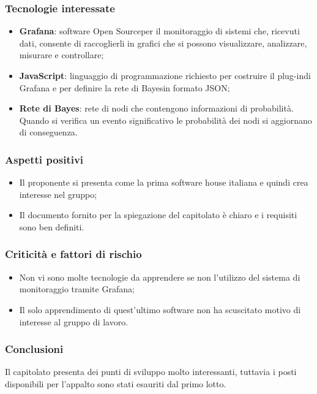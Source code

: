 \subsubsection{Tecnologie interessate}
\begin{itemize}
	\item \textbf{Grafana}: software Open Source\glo per il monitoraggio di sistemi che, ricevuti dati, consente di raccoglierli in grafici che si possono visualizzare, analizzare, misurare e controllare; 
	\item \textbf{JavaScript}: linguaggio di programmazione richiesto per costruire il plug-in\glo di Grafana e per definire la rete di Bayes\glo in formato JSON\glo;
	\item \textbf{Rete di Bayes}: rete di nodi che contengono informazioni di probabilità. Quando si verifica un evento significativo le probabilità dei nodi si aggiornano di conseguenza.
\end{itemize}
\subsubsection{Aspetti positivi}
\begin{itemize}
	\item Il proponente si presenta come la prima software house italiana e quindi crea interesse nel gruppo;
	\item Il documento fornito per la spiegazione del capitolato è chiaro e i requisiti sono ben definiti.
\end{itemize}
\subsubsection{Criticità e fattori di rischio}
\begin{itemize}
	\item Non vi sono molte tecnologie da apprendere se non l'utilizzo del sistema di monitoraggio tramite Grafana;
	\item Il solo apprendimento di quest'ultimo software non ha scuscitato motivo di interesse al gruppo di lavoro.
\end{itemize}
\subsubsection{Conclusioni}
Il capitolato presenta dei punti di sviluppo molto interessanti, tuttavia i posti disponibili per l'appalto sono stati esauriti dal primo lotto.